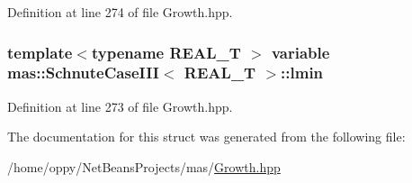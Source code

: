Definition at line 274 of file Growth.\-hpp.

\hypertarget{structmas_1_1_schnute_case_i_i_i_a428c1da272df27ab99d278aef25fdb9d}{
\subsubsection[{lmin}]{\setlength{\rightskip}{0pt plus 5cm}template$<$typename R\-E\-A\-L\-\_\-\-T $>$ {\bf variable} {\bf mas\-::\-Schnute\-Case\-I\-I\-I}$<$ R\-E\-A\-L\-\_\-\-T $>$\-::lmin}}\label{structmas_1_1_schnute_case_i_i_i_a428c1da272df27ab99d278aef25fdb9d}


Definition at line 273 of file Growth.\-hpp.



The documentation for this struct was generated from the following file\-:\begin{DoxyCompactItemize}
\item 
/home/oppy/\-Net\-Beans\-Projects/mas/\hyperlink{_growth_8hpp}{Growth.\-hpp}\end{DoxyCompactItemize}
